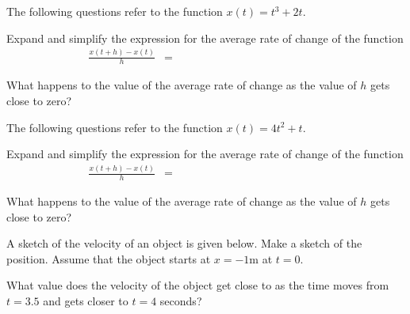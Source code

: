 \begin{problem}
  \item The following questions refer to the function $x(t)=t^3+2t$.
    \begin{subproblem}
    \item Expand and simplify the expression for the average rate of
      change of the function
      \begin{eqnarray*}
        \frac{x(t+h)-x(t)}{h} & = & ~~~~~~~~~~~~~~~~~~~~~~~~~~~~~~~~~~~~~~~~~~~~~~~~~~~~~~~~~~
      \end{eqnarray*}
      \vspace{3em}
    \item What happens to the value of the average rate of change as
      the value of $h$ gets close to zero?
      \vspace{3em}
    \end{subproblem}

    \clearpage

  \item The following questions refer to the function $x(t)=4t^2+t$.
    \begin{subproblem}
    \item Expand and simplify the expression for the average rate of
      change of the function
      \begin{eqnarray*}
        \frac{x(t+h)-x(t)}{h} & = & ~~~~~~~~~~~~~~~~~~~~~~~~~~~~~~~~~~~~~~~~~~~~~~~~~~~~~~~~~~
      \end{eqnarray*}
      \vspace{3em}
    \item What happens to the value of the average rate of change as
      the value of $h$ gets close to zero?
      \vspace{3em}
    \end{subproblem}

    \clearpage

  \item A sketch of the velocity of an object is given below. Make a
    sketch of the position. Assume that the object starts at $x=-1$m
    at $t=0$.
    
    \scalebox{0.8}{}

    \begin{subproblem}
    \item What value does the velocity of the object get close to as
      the time moves from $t=3.5$ and gets closer to $t=4$ seconds?
    \end{subproblem}

\end{problem}

